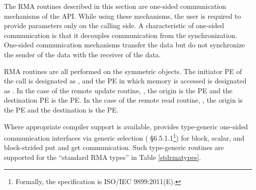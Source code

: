 The \ac{RMA} routines described in this section are one-sided communication
mechanisms of the \openshmem{} \ac{API}. While using these mechanisms, the user
is required to provide parameters only on the calling side. A characteristic of
one-sided communication is that it decouples communication from the
synchronization. One-sided communication mechanisms transfer the data but do not
synchronize the sender of the data with the receiver of the data. 

\openshmem{} \ac{RMA} routines are all performed on the symmetric objects.  The
initiator \ac{PE} of the call is designated as \source{}, and the \ac{PE} in
which memory is accessed is designated as \dest{}. In the case of the remote
update routine, \PUT{}, the origin is the \source{} \ac{PE} and the destination
\ac{PE} is the \dest{} PE. In the case of the remote read routine, \GET{}, the
origin is the \dest{} \ac{PE} and the destination is the \source{} \ac{PE}.

Where appropriate compiler support is available, \openshmem{} provides type-generic 
one-sided communication interfaces via \Celev{} generic selection 
(\Celev{} \S6.5.1.1\footnote{Formally, the \Celev{} specification is ISO/IEC 9899:2011(E).})
for block, scalar, and block-strided put and get communication. 
Such type-generic routines are supported for the
``standard \ac{RMA} types''
  in Table \ref{stdrmatypes}.

